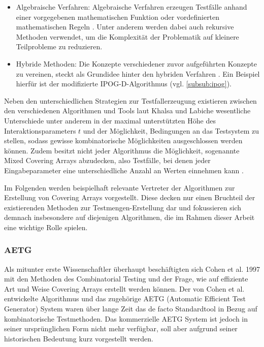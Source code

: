 \begin{itemize}
\item Algebraische Verfahren: Algebraische Verfahren erzeugen Testfälle anhand einer vorgegebenen mathematischen Funktion oder vordefinierten mathematischen Regeln \cite{khalsa2014orchestrated}. Unter anderem werden dabei auch rekursive Methoden verwendet, um die Komplexität der Problematik auf kleinere Teilprobleme zu reduzieren.
\item Hybride Methoden: Die Konzepte verschiedener zuvor aufgeführten Konzepte zu vereinen, steckt als Grundidee hinter den hybriden Verfahren \cite{khalsa2014orchestrated}. Ein Beispiel hierfür ist der modifizierte IPOG-D-Algorithmus (vgl. \autoref{subsub:ipog}).
\end{itemize}

Neben den unterschiedlichen Strategien zur Testfallerzeugung existieren zwischen den verschiedenen Algorithmen und Tools laut Khalsa und Labiche \cite{khalsa2014orchestrated} wesentliche Unterschiede unter anderem in der maximal unterstützten Höhe des Interaktionsparameters $t$ und der Möglichkeit, Bedingungen an das Testsystem zu stellen, sodass gewisse kombinatorische Möglichkeiten ausgeschlossen werden können. Zudem besitzt nicht jeder Algorithmus die Möglichkeit, sogenannte Mixed Covering Arrays abzudecken, also Testfälle, bei denen jeder Eingabeparameter eine unterschiedliche Anzahl an Werten einnehmen kann \cite{khalsa2014orchestrated}.

Im Folgenden werden beispielhaft relevante Vertreter der Algorithmen zur Erstellung von Covering Arrays vorgestellt. Diese decken nur einen Bruchteil der existierenden Methoden zur Testmengen-Erstellung dar und fokussieren sich demnach insbesondere auf diejenigen Algorithmen, die im Rahmen dieser Arbeit eine wichtige Rolle spielen.

\subsubsection{AETG}\label{subsub:aetg}

Als mitunter erste Wissenschaftler überhaupt beschäftigten sich Cohen et al. \cite{cohen1997aetg} 1997 mit den Methoden des Combinatorial Testing und der Frage, wie auf effiziente Art und Weise Covering Arrays erstellt werden können. Der von Cohen et al. \cite{cohen1997aetg} entwickelte Algorithmus und das zugehörige AETG (Automatic Efficient Test Generator) System waren über lange Zeit das de facto Standardtool in Bezug auf kombinatorische Testmethoden. Das kommerzielle AETG System ist jedoch in seiner ursprünglichen Form nicht mehr verfügbar, soll aber aufgrund seiner historischen Bedeutung kurz vorgestellt werden.

